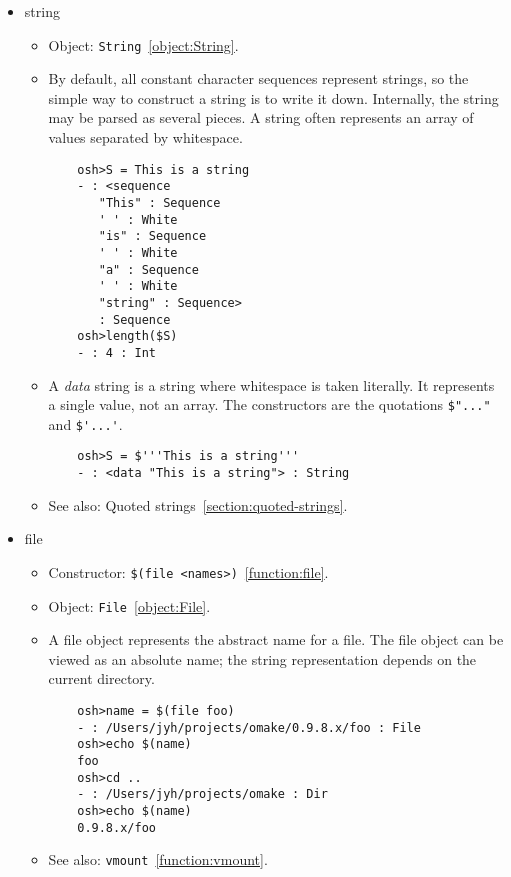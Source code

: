 \begin{itemize}
\item string

\begin{itemize}
\item Object: \verb+String+~\ref{object:String}.
\item By default, all constant character sequences represent strings, so the simple way to construct
  a string is to write it down.  Internally, the string may be parsed as several pieces.
  A string often represents an array of values separated by whitespace.
\begin{verbatim}
    osh>S = This is a string
    - : <sequence
       "This" : Sequence
       ' ' : White
       "is" : Sequence
       ' ' : White
       "a" : Sequence
       ' ' : White
       "string" : Sequence>
       : Sequence
    osh>length($S)
    - : 4 : Int
\end{verbatim}

\item A \emph{data} string is a string where whitespace is taken literally.  It represents a single value,
  not an array.  The constructors are the quotations \verb+$"..."+ and \verb+$'...'+.

\begin{verbatim}
    osh>S = $'''This is a string'''
    - : <data "This is a string"> : String
\end{verbatim}

\item See also: Quoted strings~\ref{section:quoted-strings}.
\end{itemize}

\item file

\begin{itemize}
\item Constructor: \verb+$(file <names>)+~\ref{function:file}.
\item Object: \verb+File+~\ref{object:File}.
\item A file object represents the abstract name for a file.  The file object can be viewed as an
  absolute name; the string representation depends on the current directory.

\begin{verbatim}
    osh>name = $(file foo)
    - : /Users/jyh/projects/omake/0.9.8.x/foo : File
    osh>echo $(name)
    foo
    osh>cd ..
    - : /Users/jyh/projects/omake : Dir
    osh>echo $(name)
    0.9.8.x/foo
\end{verbatim}

\item See also: \verb+vmount+~\ref{function:vmount}.
\end{itemize}


\end{itemize}
